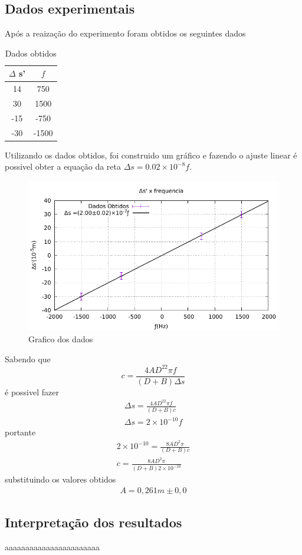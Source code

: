 \subsection{Dados experimentais}
Após a reaização do experimento foram obtidos os seguintes dados
\begin{table}[h!]
\centering

\begin{tabular}{|	c	|	c	|}
\hline
$\Delta$ s' & $f$   \\ \hline
14          & 750   \\ \hline
30          & 1500  \\ \hline
-15         & -750  \\ \hline
-30         & -1500 \\ \hline
\end{tabular}
\caption{Dados obtidos}
\end{table}
Utilizando os dados obtidos, foi construido um gráfico e fazendo o
ajuste linear é possivel obter a equação da reta $\Delta s
=0.02\times10^{-8}f$.


\begin{figure}[!h]
	\centering
		\includegraphics[scale= 1.1]{Graficusao/c.pdf}
	\caption{Grafico dos dados}
\end{figure}


Sabendo que
\begin{equation}
	c = \frac{4AD^22\pi f}{(D+B)\Delta s}
\end{equation}
é possivel fazer
\begin{equation}
\begin{split}
	\Delta s = \frac{4AD^22\pi f}{(D+B)c}\\
	\Delta s = 2\times10^{-10}f
\end{split}
\end{equation}
portante
\begin{equation}
\begin{split}
	2\times10^{-10}=\frac{8AD^2\pi}{(D+B)c}\\
	c=\frac{8AD^2\pi}{(D+B)2\times10^{-10}}
\end{split}
\end{equation}
substituindo os valores obtidos
\begin{equation}
	\begin{split}
		A = 0,261 m \pm 0,0
	\end{split}
\end{equation}
\subsection{Interpretação dos resultados}

aaaaaaaaaaaaaaaaaaaaaaa
